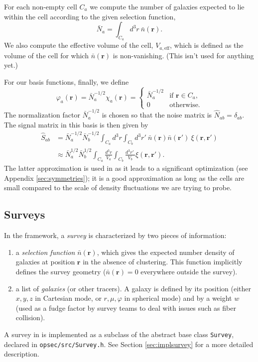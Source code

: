 \documentclass{article}
\newcommand{\opsec}{\protect{\textrm{OPSEC}}\xspace}
\renewcommand{\vec}[1]{\bm{#1}}
\renewcommand{\r}{\vec{r}}
\renewcommand{\phi}{\varphi}
\newcommand{\Shat}{\widehat{S}}
\newcommand{\Nhat}{\widehat{N}}
\begin{document}
For each non-empty cell $C_a$ we compute the number of galaxies expected to lie
within the cell according to the given selection function,
\begin{equation}
    \bar{N}_a = \int_{C_a} d^3r~ \bar{n}(\r).
\end{equation}
We also compute the effective volume of the cell, $V_{a,\text{eff}}$, which is
defined as the volume of the cell for which $\bar{n}(\r)$ is non-vanishing.
(This isn't used for anything yet.)

For our basis functions, finally, we define
\begin{equation}
    \phi_a(\r) = \bar{N}_a^{-1/2} \chi_a(\r) = \begin{cases} \bar{N}_a^{-1/2} & \text{if } \r \in C_a, \\ 0 & \text{otherwise}. \end{cases}
\end{equation}
The normalization factor $\bar{N}_a^{-1/2}$ is chosen so that the noise matrix
is $\Nhat_{ab} = \delta_{ab}$.  The signal matrix in this basis is then given
by
\begin{align}
    \Shat_{ab} &= \bar{N}_a^{-1/2} \bar{N}_b^{-1/2} \int_{C_a} d^3r \int_{C_b} d^3r'~ \bar{n}(\r) \bar{n}(\r')~ \xi(\r,\r') \\
    &\approx \bar{N}_a^{1/2} \bar{N}_b^{1/2} \int_{C_a} \frac{d^3r}{V_a} \int_{C_b} \frac{d^3r'~}{V_b} \xi(\r,\r').
\end{align}
The latter approximation is used in \opsec as it leads to a significant
optimization (see Appendix \ref{sec:symmetries}); it is a good approximation as
long as the cells are small compared to the scale of density fluctuations we
are trying to probe.

\subsection{Surveys}
\label{sec:survey}

In the \opsec framework, a \emph{survey} is characterized by two pieces of
information:
\begin{enumerate}
\item a \emph{selection function} $\bar{n}(\r)$, which gives the expected
    number density of galaxies at position $\r$ in the absence of clustering.
    This function implicitly defines the survey geometry ($\bar{n}(\r) = 0$
    everywhere outside the survey).
\item a list of \emph{galaxies} (or other tracers).  A galaxy is defined by
    its position (either $x,y,z$ in Cartesian mode, or $r,\mu,\phi$ in
    spherical mode) and by a weight $w$ (used as a fudge factor by survey
    teams to deal with issues such as fiber collision).
\end{enumerate}
A survey in \opsec is implemented as a subclass of the abstract base class
\texttt{Survey}, declared in \texttt{opsec/src/Survey.h}.  See Section
\ref{sec:implsurvey} for a more detailed description.
\end{document}
